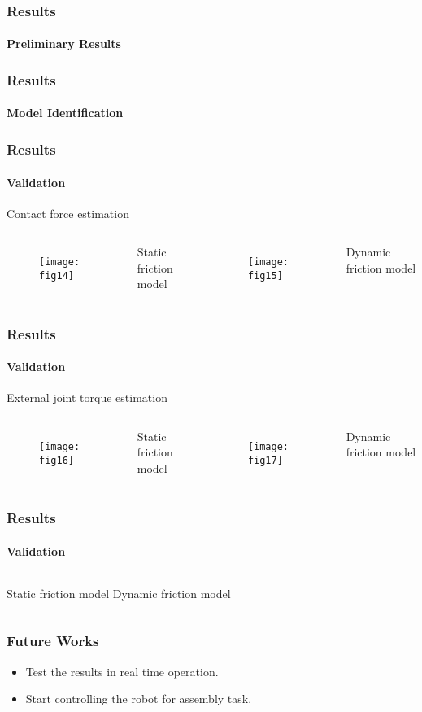 \documentclass[12pt,english]{beamer}
\begin{document}
  \begin{frame}
    \frametitle{Results}
    \framesubtitle{Preliminary Results}
  \end{frame}
  
  \begin{frame}
    \frametitle{Results}
    \framesubtitle{Model Identification}
  \end{frame}
  
  \begin{frame}
    \frametitle{Results}
    \framesubtitle{Validation}
    Contact force estimation
    \begin{columns}
      \centering
        \begin{figure}
          \texttt{[image: fig14]}
        \end{figure}
        Static friction model
      \centering
        \begin{figure}
          \texttt{[image: fig15]}
        \end{figure}
        Dynamic friction model
    \end{columns}
  \end{frame}

  \begin{frame}
    \frametitle{Results}
    \framesubtitle{Validation}
    External joint torque estimation
    \begin{columns}
      \centering
        \begin{figure}
          \texttt{[image: fig16]}
        \end{figure}
        Static friction model
      \centering
        \begin{figure}
          \texttt{[image: fig17]}
        \end{figure}
        Dynamic friction model
    \end{columns}
  \end{frame}
  
  \begin{frame}
    \frametitle{Results}
    \framesubtitle{Validation}
    \begin{columns}
        Static friction model
        Dynamic friction model
    \end{columns}
  \end{frame}
  \begin{frame}
    \frametitle{Future Works}
    \begin{itemize}
      \item Test the results in real time operation.
      \item Start controlling the robot for assembly task.
    \end{itemize}
  \end{frame}
\end{document}
